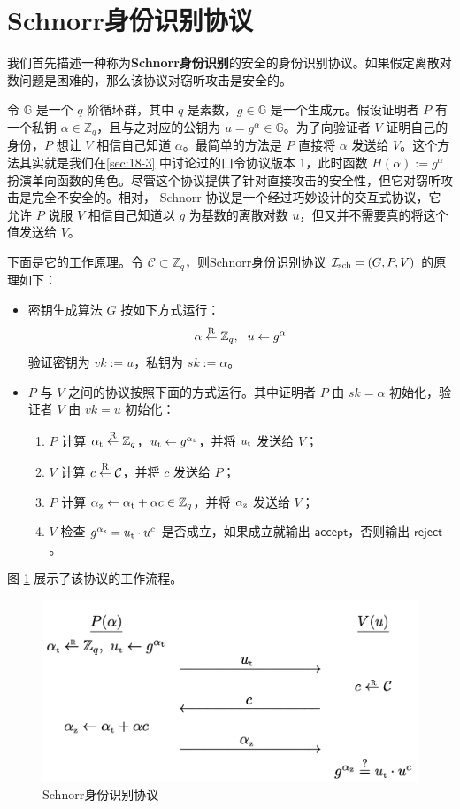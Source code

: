 \section{Schnorr身份识别协议}

我们首先描述一种称为\textbf{Schnorr身份识别}的安全的身份识别协议。如果假定离散对数问题是困难的，那么该协议对窃听攻击是安全的。

令 $\mathbb{G}$ 是一个 $q$ 阶循环群，其中 $q$ 是素数，$g\in\mathbb{G}$ 是一个生成元。假设证明者 $P$ 有一个私钥 $\alpha\in\mathbb{Z}_q$，且与之对应的公钥为 $u=g^{\alpha}\in\mathbb{G}$。为了向验证者 $V$ 证明自己的身份，$P$ 想让 $V$ 相信自己知道 $\alpha$。最简单的方法是 $P$ 直接将 $\alpha$ 发送给 $V$。这个方法其实就是我们在\ref{sec:18-3} 中讨论过的口令协议版本 1，此时函数 $H(\alpha):=g^\alpha$扮演单向函数的角色。尽管这个协议提供了针对直接攻击的安全性，但它对窃听攻击是完全不安全的。相对， Schnorr 协议是一个经过巧妙设计的交互式协议，它允许 $P$ 说服 $V$ 相信自己知道以 $g$ 为基数的离散对数 $u$，但又并不需要真的将这个值发送给 $V$。

下面是它的工作原理。令 $\mathcal{C}\subset\mathbb{Z}_q$，则Schnorr身份识别协议 $\mathcal{I}_{\rm sch}=(G,P,V)$ 的原理如下：
\begin{itemize}
	\item 密钥生成算法 $G$ 按如下方式运行：
		$$\alpha\overset{\rm R}\leftarrow\mathbb{Z}_q, ~~ u\leftarrow g^\alpha$$
		验证密钥为 $vk:=u$，私钥为 $sk:=\alpha$。
	\item $P$ 与 $V$ 之间的协议按照下面的方式运行。其中证明者 $P$ 由 $sk=\alpha$ 初始化，验证者 $V$ 由 $vk=u$ 初始化：
	\begin{enumerate}
		\item $P$ 计算 $\alpha_{\rm t}\overset{\rm R}\leftarrow\mathbb{Z}_q$，$u_{\rm t}\leftarrow g^{\alpha_{\rm t}}$，并将 $u_{\rm t}$ 发送给 $V$；
		\item $V$ 计算 $c\overset{\rm R}\leftarrow\mathcal{C}$，并将 $c$ 发送给 $P$；
		\item $P$ 计算 $\alpha_{\rm z}\leftarrow \alpha_{\rm t}+\alpha c\in \mathbb{Z}_q$，并将 $\alpha_{\rm z}$ 发送给 $V$；
		\item $V$ 检查 $g^{\alpha_{\rm z}}=u_{\rm t}\cdot u^c$ 是否成立，如果成立就输出 $\mathsf{accept}$，否则输出 $\mathsf{reject}$。
	\end{enumerate}
\end{itemize}
图 \ref{fig:19-1} 展示了该协议的工作流程。

\begin{figure}
  \centering
  \includegraphics[width=0.55\linewidth]{figures/chapter19/fig1.png}
  \caption{Schnorr身份识别协议}
  \label{fig:19-1}
\end{figure}

